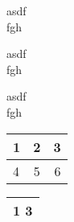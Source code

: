\documentclass[11pt, oneside, a4paper]{article}
\begin{document}
\begin{flushleft}
    asdf \\ fgh
\end{flushleft}
\begin{center}
    asdf \\ fgh
\end{center}
\begin{flushright}
    asdf \\ fgh
\end{flushright}
\begin{tabular}{|l|c|r|}    %
    \hline    %
    1 & 2 & 3\\    %
    \hline \hline
    4 & 5 & 6\\    %
    \hline
\end{tabular}

\begin{tabular}{c}    %
    \hline    %
    1 3\\    %
    \hline
\end{tabular}

\end{document}
